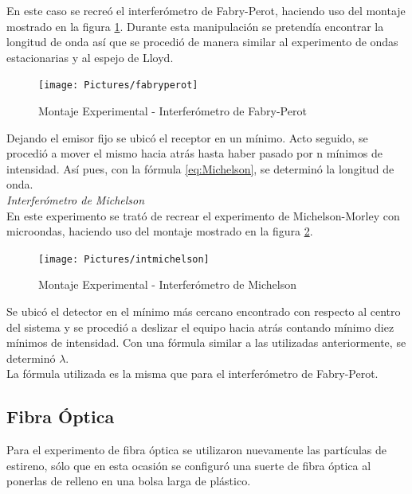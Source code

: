 \documentclass[prb,aps,twocolumn,preprintnumbers,amsmath,amssymb]{revtex4}
\begin{document}
En este caso se recreó el interferómetro de Fabry-Perot, haciendo uso del montaje mostrado en la figura \ref{fig:fabryperot}. Durante esta manipulación se pretendía encontrar la longitud de onda así que se procedió de manera similar al experimento de ondas estacionarias y al espejo de Lloyd.\\


\begin{figure}[h!]
\centering
\texttt{[image: Pictures/fabryperot]}
\caption{Montaje Experimental - Interferómetro de Fabry-Perot}
\label{fig:fabryperot}
\end{figure}

Dejando el emisor fijo se ubicó el receptor en un mínimo. Acto seguido, se procedió a mover el mismo hacia atrás hasta haber pasado por n mínimos de intensidad. Así pues, con la fórmula \ref{eq:Michelson}, se determinó la longitud de onda. \\ 

\textit{Interferómetro de Michelson} \\

En este experimento se trató de recrear el experimento de Michelson-Morley con microondas, haciendo uso del montaje mostrado en la figura \ref{fig:intmichelson}. \\

\begin{figure}[h!]
\centering
\texttt{[image: Pictures/intmichelson]}
\caption{Montaje Experimental - Interferómetro de Michelson}
\label{fig:intmichelson}
\end{figure}

Se ubicó el detector en el mínimo más cercano encontrado con respecto al centro del sistema y se procedió a deslizar el equipo hacia atrás contando mínimo diez mínimos de intensidad. Con una fórmula similar a las utilizadas anteriormente, se determinó $ \lambda $. \\

La fórmula utilizada es la misma que para el interferómetro de Fabry-Perot. \\


\subsection{\label{sec:level2}Fibra Óptica}

Para el experimento de fibra óptica se utilizaron nuevamente las partículas de estireno, sólo que en esta ocasión se configuró una suerte de fibra óptica al ponerlas de relleno en una bolsa larga de plástico. \\
\end{document}
